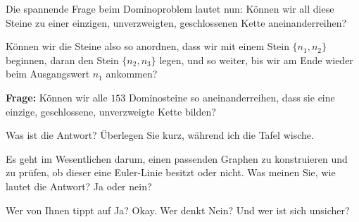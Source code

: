 \begin{spoken-clean}[00:23:51 - 00:25:23]
Die spannende Frage beim Dominoproblem lautet nun: Können wir all diese Steine zu einer einzigen, unverzweigten, geschlossenen Kette aneinanderreihen?

Können wir die Steine also so anordnen, dass wir mit einem Stein $\{n_1, n_2\}$ beginnen, daran den Stein $\{n_2, n_3\}$ legen, und so weiter, bis wir am Ende wieder beim Ausgangswert $n_1$ ankommen?
\end{spoken-clean}

\begin{math-stroke}
\textbf{Frage:} Können wir alle $153$ Dominosteine so aneinanderreihen, dass sie eine einzige, geschlossene, unverzweigte Kette bilden?
\begin{center}
\end{center}
\end{math-stroke}

\begin{spoken-clean}[00:25:23 - 00:26:25]
Was ist die Antwort? Überlegen Sie kurz, während ich die Tafel wische.

Es geht im Wesentlichen darum, einen passenden Graphen zu konstruieren und zu prüfen, ob dieser eine Euler-Linie besitzt oder nicht. Was meinen Sie, wie lautet die Antwort? Ja oder nein?

Wer von Ihnen tippt auf Ja? Okay. Wer denkt Nein? Und wer ist sich unsicher? 
\end{spoken-clean}

